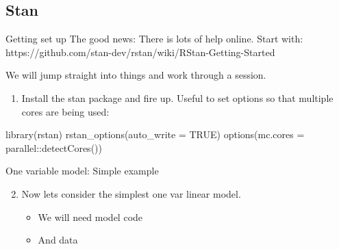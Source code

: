 \documentclass[
  11pt,
  ignorenonframetext,
]{beamer}
\newenvironment{Shaded}{\begin{snugshade}}{\end{snugshade}}
\newcommand{\AttributeTok}[1]{\textcolor[rgb]{0.40,0.45,0.13}{#1}}
\newcommand{\ConstantTok}[1]{\textcolor[rgb]{0.56,0.35,0.01}{#1}}
\newcommand{\FunctionTok}[1]{\textcolor[rgb]{0.28,0.35,0.67}{#1}}
\newcommand{\NormalTok}[1]{\textcolor[rgb]{0.00,0.23,0.31}{#1}}
\newcommand{\SpecialCharTok}[1]{\textcolor[rgb]{0.37,0.37,0.37}{#1}}
\providecommand{\tightlist}{%
  \setlength{\itemsep}{0pt}\setlength{\parskip}{0pt}}\usepackage{longtable,booktabs,array}
\begin{document}
\hypertarget{stan-1}{%
\subsection{Stan}\label{stan-1}}

\begin{frame}[fragile]{Getting set up}
\protect\hypertarget{getting-set-up-1}{}
The good news: There is lots of help online. Start with:
https://github.com/stan-dev/rstan/wiki/RStan-Getting-Started

We will jump straight into things and work through a session.

\begin{enumerate}
\tightlist
\item
  Install the stan package and fire up. Useful to set options so that
  multiple cores are being used:
\end{enumerate}

\begin{Shaded}
\begin{Highlighting}[]
\FunctionTok{library}\NormalTok{(rstan)}
\FunctionTok{rstan\_options}\NormalTok{(}\AttributeTok{auto\_write =} \ConstantTok{TRUE}\NormalTok{)}
\FunctionTok{options}\NormalTok{(}\AttributeTok{mc.cores =}\NormalTok{ parallel}\SpecialCharTok{::}\FunctionTok{detectCores}\NormalTok{())}
\end{Highlighting}
\end{Shaded}
\end{frame}

\begin{frame}{One variable model: Simple example}
\protect\hypertarget{one-variable-model-simple-example-1}{}
\begin{enumerate}
\setcounter{enumi}{1}
\tightlist
\item
  Now lets consider the simplest one var linear model.

  \begin{itemize}
  \tightlist
  \item
    We will need model code
  \item
    And data
  \end{itemize}
\end{enumerate}
\end{frame}
\end{document}
